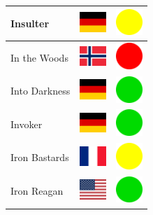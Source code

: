 \documentclass[12pt, a4paper, twoside]{report}
\begin{document}
\begin{center}
\begin{longtable}{|p{5cm}|p{2cm}|p{2cm}|}
 Insulter                                                   & \includegraphics[width=1cm]{../4x3/de} &   \includegraphics[width=1cm]{../likes/m} \\ \hline
 In the Woods                                               & \includegraphics[width=1cm]{../4x3/no} &   \includegraphics[width=1cm]{../likes/n} \\ \hline
 Into Darkness                                              & \includegraphics[width=1cm]{../4x3/de} &   \includegraphics[width=1cm]{../likes/y} \\ \hline
 Invoker                                                    & \includegraphics[width=1cm]{../4x3/de} &   \includegraphics[width=1cm]{../likes/y} \\ \hline
 Iron Bastards                                              & \includegraphics[width=1cm]{../4x3/fr} &   \includegraphics[width=1cm]{../likes/m} \\ \hline
 Iron Reagan                                                & \includegraphics[width=1cm]{../4x3/us} &   \includegraphics[width=1cm]{../likes/y} \\ \hline

\end{longtable}
\end{center}
\end{document}
